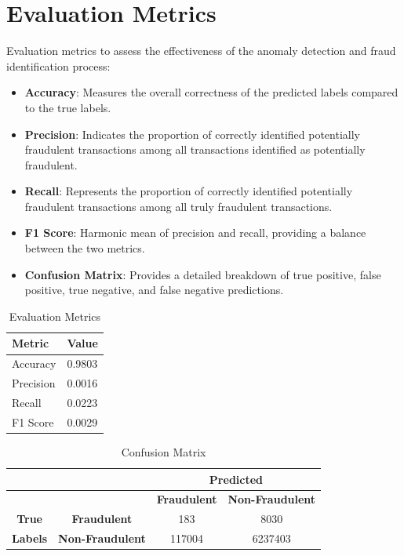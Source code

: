 \section{Evaluation Metrics}
\hspace{\parindent}
Evaluation metrics to assess the effectiveness of the anomaly detection and fraud identification process:

\begin{itemize}
	\item \textbf{Accuracy}: Measures the overall correctness of the predicted labels compared to the true labels.
	\item \textbf{Precision}: Indicates the proportion of correctly identified potentially fraudulent transactions among all transactions identified as potentially fraudulent.
	\item \textbf{Recall}: Represents the proportion of correctly identified potentially fraudulent transactions among all truly fraudulent transactions.
	\item \textbf{F1 Score}: Harmonic mean of precision and recall, providing a balance between the two metrics.
	\item \textbf{Confusion Matrix}: Provides a detailed breakdown of true positive, false positive, true negative, and false negative predictions.
\end{itemize}


\begin{table}[H]
	\centering
	\caption{Evaluation Metrics}
	\label{tab:results}
	\begin{tabular}{@{}ll@{}}
		\toprule
		Metric      & Value   \\ \midrule
		Accuracy    & 0.9803  \\
		Precision   & 0.0016  \\
		Recall      & 0.0223  \\
		F1 Score    & 0.0029  \\
		\bottomrule
	\end{tabular}
\end{table}

\begin{table}[H]
	\centering
	\caption{Confusion Matrix}
	\label{tab:confusion_matrix}
	\begin{tabular}{@{}cc|cc@{}}
		\toprule
		\multicolumn{2}{c|}{\textbf{}} & \multicolumn{2}{c}{\textbf{Predicted}} \\ \midrule
		\multicolumn{1}{c|}{}          &          & \textbf{Fraudulent}      & \textbf{Non-Fraudulent}    \\ \midrule
		\multicolumn{1}{c|}{\textbf{True}} & \textbf{Fraudulent} & 183                   & 8030                  \\
		\multicolumn{1}{c|}{\textbf{Labels}} & \textbf{Non-Fraudulent} & 117004                & 6237403               \\ \bottomrule
	\end{tabular}
\end{table}

